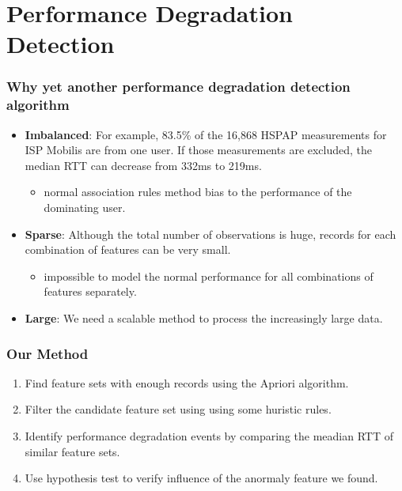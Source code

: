 \section{Performance Degradation Detection}


\begin{frame}
    \frametitle{Why yet another performance degradation detection algorithm}
    \begin{itemize}
        \item \textbf{Imbalanced}: For example, 83.5\% of the 16,868 HSPAP measurements for ISP Mobilis are from one user. If those measurements are excluded, the median RTT can decrease from 332ms to 219ms.
        \begin{itemize}
            \item normal association rules method bias to the performance of the dominating user.
        \end{itemize}
        \item \textbf{Sparse}: Although the total number of observations is huge, records for each combination of features can be very small.
        \begin{itemize}
            \item impossible to model the normal performance for all combinations of features separately.
        \end{itemize}
        \item \textbf{Large}: We need a scalable method to process the increasingly large data.
    \end{itemize}
\end{frame}

\begin{frame}
    \frametitle{Our Method}
    \begin{enumerate}
        \item Find feature sets with enough records using the Apriori algorithm.
        \item Filter the candidate feature set using using some huristic rules.
        \item Identify performance degradation events by comparing the meadian RTT of similar feature sets.
        \item Use hypothesis test to verify influence of the anormaly feature we found.
    \end{enumerate}
\end{frame}

